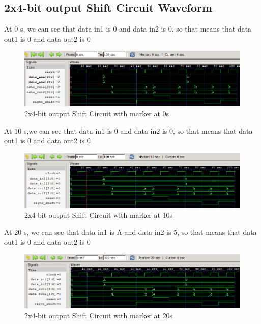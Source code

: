 \documentclass[12pt]{article}
\begin{document}
\newpage

\subsection{2x4-bit output Shift Circuit Waveform}

At 0 s, we can see that data in1 is 0 and data in2 is 0, so that means that data out1 is 0 and data out2 is 0
\begin{figure}[h]
    \centering
    \includegraphics[width = 1.0\textwidth]{figs/Shift0.png}
    \caption{2x4-bit output Shift Circuit with marker at 0s}
    \label{fig:enter-label}
\end{figure}


At 10 s,we can see that data in1 is 0 and data in2 is 0, so that means that data out1 is 0 and data out2 is 0
\begin{figure}[h]
    \centering
    \includegraphics[width = 1.0\textwidth]{figs/Shift10.png}
    \caption{2x4-bit output Shift Circuit with marker at 10s}
    \label{fig:enter-label}
\end{figure}

\newpage

At 20 s, we can see that data in1 is A and data in2 is 5, so that means that data out1 is 0 and data out2 is 0
\begin{figure}[h]
    \centering
    \includegraphics[width = 1.0\textwidth]{figs/Shift20.png}
    \caption{2x4-bit output Shift Circuit with marker at 20s}
    \label{fig:enter-label}
\end{figure}
\end{document}
